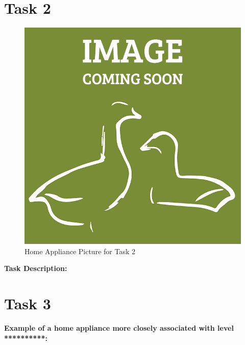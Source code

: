 \documentclass[a4paper,11pt,oneside]{scrreprt}
\begin{document}
\clearpage

\section*{Task 2}

\begin{figure}[H]
	\centering
	\includegraphics[clip, trim=0cm 0cm 0cm 0cm, scale=0.33]{./images/redesign.png}
	\caption{Home Appliance Picture for Task 2}
	\label{fig:sub4}
\end{figure}

\textbf{Task Description:}
\clearpage



\section*{Task 3}

\textbf{Example of a home appliance more closely associated with level **********:}
\end{document}
